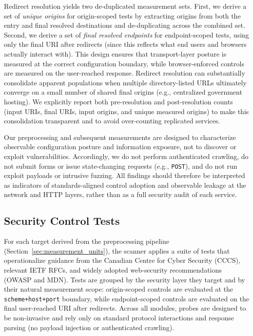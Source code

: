 \documentclass[a4paper,fleqn]{cas-sc}
\begin{document}
    Redirect resolution yields two de-duplicated measurement sets.
    First, we derive a set of \emph{unique origins} for origin-scoped tests by extracting origins from both the entry and final resolved destinations and de-duplicating across the combined set.
    Second, we derive a set of \emph{final resolved endpoints} for endpoint-scoped tests, using only the final URI after redirects (since this reflects what end users and browsers actually interact with).
    This design ensures that transport-layer posture is measured at the correct configuration boundary, while browser-enforced controls are measured on the user-reached response.
% 
    Redirect resolution can substantially consolidate apparent populations when multiple directory-listed URLs ultimately converge on a small number of shared final origins (e.g., centralized government hosting).
    We explicitly report both pre-resolution and post-resolution counts (input URIs, final URIs, input origins, and unique measured origins) to make this consolidation transparent and to avoid over-counting replicated services.

    Our preprocessing and subsequent measurements are designed to characterize observable configuration posture and information exposure, not to discover or exploit vulnerabilities.
    Accordingly, we do not perform authenticated crawling, do not submit forms or issue state-changing requests (e.g., \texttt{POST}), and do not run exploit payloads or intrusive fuzzing.
    All findings should therefore be interpreted as indicators of standards-aligned control adoption and observable leakage at the network and HTTP layers, rather than as a full security audit of each service.

    \subsection{Security Control Tests}\label{sec:security_control_tests}

    For each target derived from the preprocessing pipeline (Section~\ref{sec:measurement_units}), the scanner applies a suite of tests that operationalize guidance from the Canadian Centre for Cyber Security (CCCS), relevant IETF RFCs, and widely adopted web-security recommendations (OWASP and MDN). 
    Tests are grouped by the security layer they target and by their natural measurement scope: origin-scoped controls are evaluated at the \texttt{scheme+host+port} boundary, while endpoint-scoped controls are evaluated on the final user-reached URI after redirects. 
    Across all modules, probes are designed to be non-invasive and rely only on standard protocol interactions and response parsing (no payload injection or authenticated crawling).
\end{document}
